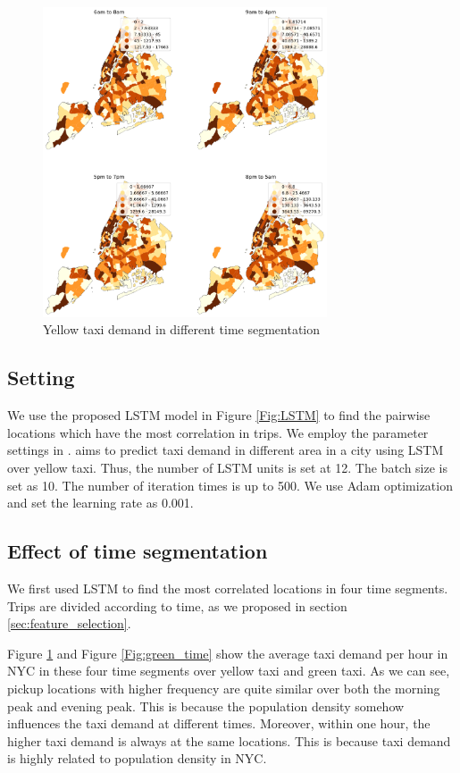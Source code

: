 \documentclass[11pt]{article}
\begin{document}
\begin{figure}[h]
\includegraphics[width=0.75\textwidth]{plots/yellow_time_seg.png}
\centering
\caption{Yellow taxi demand in different time segmentation}
\label{Fig:yel_time}
\end{figure}

\subsection{Setting}
\label{sec:setting}
We use the proposed LSTM model in Figure \ref{Fig:LSTM} to find the pairwise locations which have the most correlation in trips. We employ the parameter settings in \cite{kim2020stepwise}. \cite{kim2020stepwise} aims to predict taxi demand in different area in a city using LSTM over yellow taxi. Thus, the number of LSTM units is set at 12. The batch size is set as 10. The number of iteration times is up to 500. We use Adam optimization and set the learning rate as 0.001.


\subsection{Effect of time segmentation}
\label{sec:eff_time}
We first used LSTM to find the most correlated locations in four time segments. Trips are divided according to time, as we proposed in section \ref{sec:feature_selection}.

Figure \ref{Fig:yel_time} and Figure \ref{Fig:green_time} show the average taxi demand per hour in NYC in these four time segments over yellow taxi and green taxi. As we can see, pickup locations with higher frequency are quite similar over both the morning peak and evening peak. This is because the population density somehow influences the taxi demand at different times. Moreover, within one hour, the higher taxi demand is always at the same locations. This is because taxi demand is highly related to population density in NYC.
\end{document}
